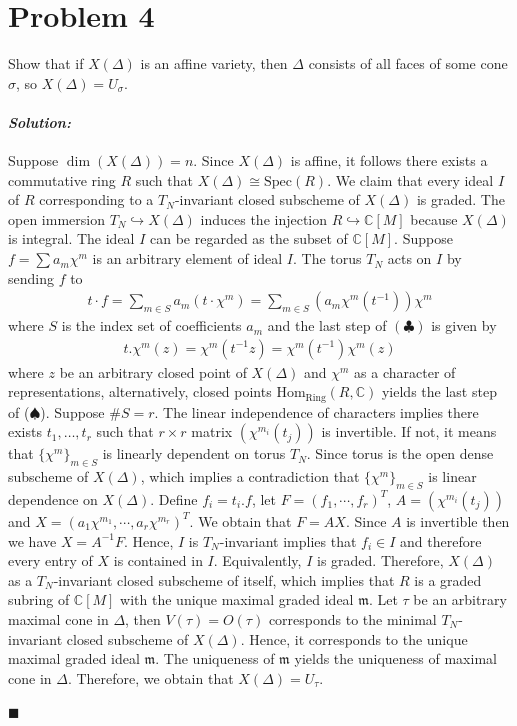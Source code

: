 \documentclass[12pt, a4paper]{article}
\newenvironment{solution}
  {\paragraph{\textit{Solution:}}\par\medskip}
  {\hfill$\blacksquare$\vspace{0.1cm}}
\begin{document}
\section*{Problem 4}
Show that if $X(\Delta)$ is an affine variety, then $\Delta$ consists of all faces of some cone $\sigma$, so $X(\Delta) = U_\sigma$.
\begin{solution}
    Suppose $\dim(X(\Delta))= n$.
    Since $X(\Delta)$ is affine, it follows there exists a commutative ring $R$ such that $X(\Delta)\cong \text{Spec}(R)$.
    We claim that every ideal $I$ of $R$ corresponding to a $T_N$-invariant closed subscheme of $X(\Delta)$ is graded.
    The open immersion $T_N\hookrightarrow X(\Delta)$ induces the injection $R \hookrightarrow \mathbb{C}[M]$ because 
    $X(\Delta)$ is integral. The ideal $I$ can be regarded as the subset of $\mathbb{C}[M]$. Suppose $f=\sum a_m\chi^m$ is an arbitrary element of ideal $I$.
    The torus $T_N$ acts on $I$ by sending $f$ to 
    \begin{align*}
        t \cdot f = \sum_{m \in S} a_m (t \cdot \chi^m) = \sum_{m \in S} \left( a_m \chi^m(t^{-1}) \right) \chi^m \tag{$\clubsuit$}
    \end{align*}
    where $S$ is the index set of coefficients $a_m$ and the last step of $(\clubsuit)$ is given by
    \begin{align*}
        t.\chi^m(z) = \chi^m (t^{-1}z) = \chi^m(t^{-1})\chi^m(z) \tag{$\spadesuit$}
    \end{align*}
    where $z$ be an arbitrary closed point of $X(\Delta)$ and $\chi^m$ as a character of representations, alternatively, closed points $\text{Hom}_{\text{Ring}}(R,\mathbb{C})$ yields the last step of ($\spadesuit$).
    Suppose $\# S = r$. The linear independence of characters implies there exists $t_1,\dots,t_r$ such that $r\times r$ matrix $(\chi^{m_i} (t_j))$ is invertible.
    If not, it means that $\{\chi^m\}_{m\in S}$ is linearly dependent on torus $T_N$. 
    Since torus is the open dense subscheme of $X(\Delta)$, which implies a contradiction that $\{\chi^m\}_{m\in S}$ is linear dependence on $X(\Delta)$.
    Define $f_i= t_i.f$, let $F=(f_1,\cdots,f_r)^T$, $A=(\chi^{m_i} (t_j))$ and $X=(a_1\chi^{m_1},\cdots,a_r\chi^{m_r})^T$. We obtain that $F=AX$. Since $A$ is invertible then we have $X=A^{-1}F$.
    Hence, $I$ is $T_N$-invariant implies that $f_i\in I$ and therefore every entry of $X$ is contained in $I$. Equivalently, $I$ is graded. 
    Therefore, $X(\Delta)$ as a $T_N$-invariant closed subscheme of itself, which implies that $R$ is a graded subring of $\mathbb{C}[M]$ with the unique maximal graded ideal $\mathfrak{m}$.
    Let $\tau$ be an arbitrary maximal cone in $\Delta$, then $V(\tau)=O(\tau)$ corresponds to the minimal $T_N$-invariant closed subscheme of $X(\Delta)$. Hence, it corresponds to the unique maximal graded ideal $\mathfrak{m}$.
    The uniqueness of $\mathfrak{m}$ yields the uniqueness of maximal cone in $\Delta$. Therefore, we obtain that $X(\Delta)=U_{\tau}$.

    

\end{solution}
\end{document}
